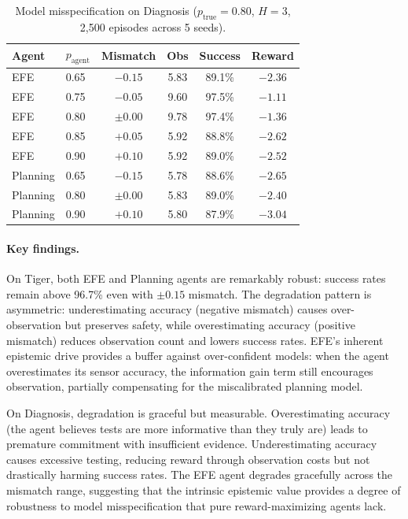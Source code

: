 \documentclass[runningheads]{llncs}
\begin{document}
\begin{table}[h]
\centering
\caption{Model misspecification on Diagnosis ($p_{\text{true}}{=}0.80$, $H{=}3$, 2{,}500 episodes across 5 seeds).}
\label{tab:misspec-diag}
\begin{small}
\begin{tabular}{llcccc}
\toprule
Agent & $p_{\text{agent}}$ & Mismatch & Obs & Success & Reward \\
\midrule
EFE & 0.65 & $-0.15$ & 5.83 & 89.1\% & $-2.36$ \\
EFE & 0.75 & $-0.05$ & 9.60 & 97.5\% & $-1.11$ \\
EFE & 0.80 & $\pm 0.00$ & 9.78 & 97.4\% & $-1.36$ \\
EFE & 0.85 & $+0.05$ & 5.92 & 88.8\% & $-2.62$ \\
EFE & 0.90 & $+0.10$ & 5.92 & 89.0\% & $-2.52$ \\
\midrule
Planning & 0.65 & $-0.15$ & 5.78 & 88.6\% & $-2.65$ \\
Planning & 0.80 & $\pm 0.00$ & 5.83 & 89.0\% & $-2.40$ \\
Planning & 0.90 & $+0.10$ & 5.80 & 87.9\% & $-3.04$ \\
\bottomrule
\end{tabular}
\end{small}
\end{table}

\paragraph{Key findings.} On Tiger, both EFE and Planning agents are remarkably robust: success rates remain above 96.7\% even with $\pm 0.15$ mismatch. The degradation pattern is asymmetric: underestimating accuracy (negative mismatch) causes over-observation but preserves safety, while overestimating accuracy (positive mismatch) reduces observation count and lowers success rates. EFE's inherent epistemic drive provides a buffer against over-confident models: when the agent overestimates its sensor accuracy, the information gain term still encourages observation, partially compensating for the miscalibrated planning model.

On Diagnosis, degradation is graceful but measurable. Overestimating accuracy (the agent believes tests are more informative than they truly are) leads to premature commitment with insufficient evidence. Underestimating accuracy causes excessive testing, reducing reward through observation costs but not drastically harming success rates. The EFE agent degrades gracefully across the mismatch range, suggesting that the intrinsic epistemic value provides a degree of robustness to model misspecification that pure reward-maximizing agents lack.
\end{document}
